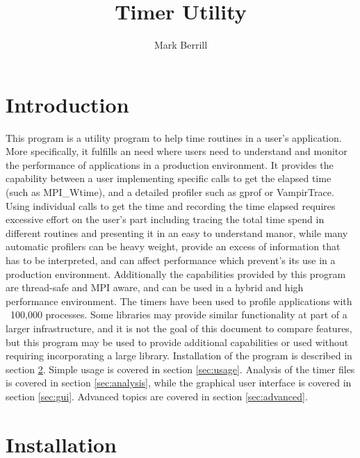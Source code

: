 \documentclass[fleqn,10pt,letterpaper]{article}
\begin{document}
\title{Timer Utility}
\author{Mark Berrill}
\maketitle



\section{Introduction}

This program is a utility program to help time routines in a user's application.
More specifically, it fulfills an need where users need to understand and monitor 
the performance of applications in a production environment.  It provides the 
capability between a user implementing specific calls to get the elapsed time 
(such as MPI\_Wtime), and a detailed profiler such as gprof or VampirTrace.  
Using individual calls to get the time and recording the time elapsed requires
excessive effort on the user's part including tracing the total time spend in 
different routines and presenting it in an easy to understand manor, while many
automatic profilers can be heavy weight, provide an excess of information that
has to be interpreted, and can affect performance which prevent's its use in a 
production environment.  Additionally the capabilities provided by this program
are thread-safe and MPI aware, and can be used in a hybrid and high performance
environment.  The timers have been used to profile applications with ~100,000
processes.  Some libraries may provide similar functionality at part of a larger 
infrastructure, and it is not the goal of this document to compare features, but 
this program may be used to provide additional capabilities or used without requiring
incorporating a large library.  
Installation of the program is described in section \ref{sec:install}.  
Simple usage is covered in section \ref{sec:usage}.  
Analysis of the timer files is covered in section \ref{sec:analysis},
while the graphical user interface is covered in section \ref{sec:gui}.
Advanced topics are covered in section \ref{sec:advanced}.  



\section{Installation}  \label{sec:install}
\end{document}
